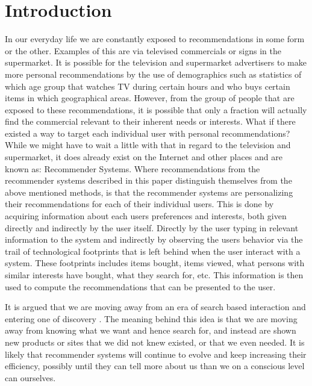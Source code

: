 \section{Introduction}
In our everyday life we are constantly exposed to recommendations in some form or the other. Examples of this are via televised commercials or signs in the supermarket.
It is possible for the television and supermarket advertisers to make more personal recommendations by the use of demographics such as statistics of which age group that watches TV during certain hours and who buys certain items in which geographical areas. However, from the group of people that are exposed to these recommendations, it is possible that only a fraction will actually find the commercial relevant to their inherent needs or interests. What if there existed a way to target each individual user with personal recommendations? While we might have to wait a little with that in regard to the television and supermarket, it does already exist on the Internet and other places and are known as: Recommender Systems.\newline
Where recommendations from the recommender systems described in this paper distinguish themselves from the above mentioned methods, is that the recommender systems are personalizing their recommendations for each of their individual users. This is done by acquiring information about each users preferences and interests, both given directly and indirectly by the user itself. Directly by the user typing in relevant information to the system and indirectly by observing the users behavior via the trail of technological footprints that is left behind when the user interact with a system. These footprints includes items bought, items viewed, what persons with similar interests have bought, what they search for, etc. This information is then used to compute the recommendations that can be presented to the user.

It is argued that we are moving away from an era of search based interaction and entering one of discovery \citep{racetocreate}. The meaning behind this idea is that we are moving away from knowing what we want and hence search for, and instead are shown new products or sites that we did not knew existed, or that we even needed. It is likely that recommender systems will continue to evolve and keep increasing their efficiency, possibly until they can tell more about us than we on a conscious level can ourselves.
\newpage

